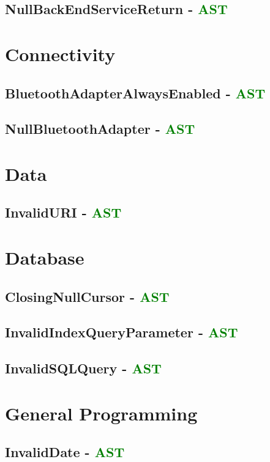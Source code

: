 \subsection{NullBackEndServiceReturn - \textcolor{green}{AST}}

\section{Connectivity}
\subsection{BluetoothAdapterAlwaysEnabled - \textcolor{green}{AST}}
\subsection{NullBluetoothAdapter - \textcolor{green}{AST}}

\section{Data}
\subsection{InvalidURI - \textcolor{green}{AST}}

\section{Database}
\subsection{ClosingNullCursor - \textcolor{green}{AST}}
\subsection{InvalidIndexQueryParameter - \textcolor{green}{AST}}
\subsection{InvalidSQLQuery - \textcolor{green}{AST}}

\section{General Programming}
\subsection{InvalidDate - \textcolor{green}{AST}}
